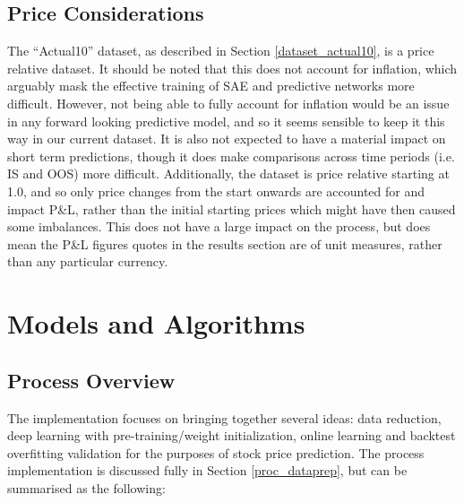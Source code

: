 \documentclass[a4paper,11pt,oneside]{article}
\theoremstyle{plain}
\theoremstyle{definition}
\begin{document}
	\subsection{Price Considerations}\label{data_prices}
	
	The ``Actual10'' dataset, as described in Section \ref{dataset_actual10}, is a price relative dataset. It should be noted that this does not account for inflation, which arguably mask the effective training of SAE and predictive networks more difficult. However, not being able to fully account for inflation would be an issue in any forward looking predictive model, and so it seems sensible to keep it this way in our current dataset. It is also not expected to have a material impact on short term predictions, though it does make comparisons across time periods (i.e. IS and OOS) more difficult. Additionally, the dataset is price relative starting at 1.0, and so only price changes from the start onwards are accounted for and impact P\&L, rather than the initial starting prices which might have then caused some imbalances. This does not have a large impact on the process, but does mean the P\&L figures quotes in the results section are of unit measures, rather than any particular currency.
	
	\newpage
	\section{Models and Algorithms}\label{Implementation}
	\subsection{Process Overview}\label{ProcessOverview}\label{imp_overview}
	
	
	The implementation focuses on bringing together several ideas: data reduction, deep learning with pre-training/weight initialization, online learning and backtest overfitting validation for the purposes of stock price prediction. The process implementation is discussed fully in Section \ref{proc_dataprep}, but can be summarised as the following:
	
\end{document}
